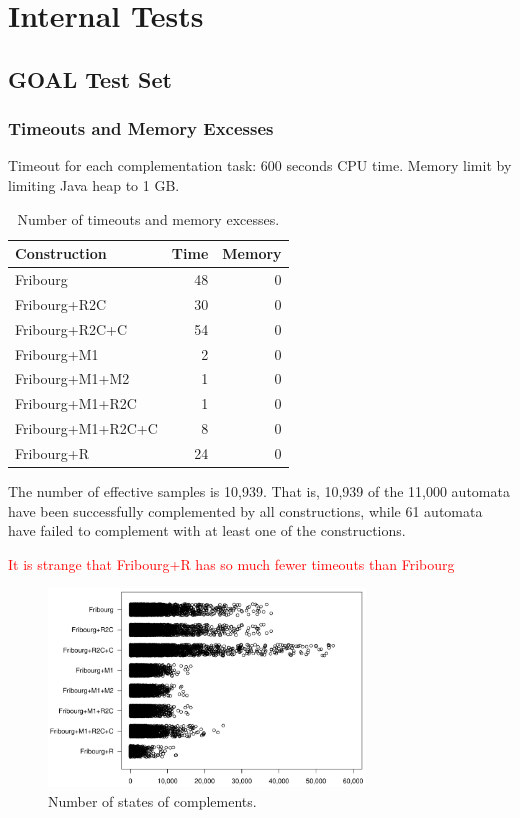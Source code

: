 \section{Internal Tests}

\subsection{GOAL Test Set}

\subsubsection{Timeouts and Memory Excesses}

Timeout for each complementation task: 600 seconds CPU time. Memory limit by limiting Java heap to 1 GB.

\begin{table}[ht]
\centering
\begin{tabular}{lrr}
  \hline
Construction & Time & Memory \\ 
  \hline
Fribourg & 48 & 0 \\ 
  Fribourg+R2C & 30 & 0 \\ 
  Fribourg+R2C+C & 54 & 0 \\ 
  Fribourg+M1 & 2 & 0 \\ 
  Fribourg+M1+M2 & 1 & 0 \\ 
  Fribourg+M1+R2C & 1 & 0 \\ 
  Fribourg+M1+R2C+C & 8 & 0 \\ 
  Fribourg+R & 24 & 0 \\ 
   \hline
\end{tabular}
\caption{Number of timeouts and memory excesses.}
\end{table}


The number of effective samples is 10,939. That is, 10,939 of the 11,000 automata have been successfully complemented by all constructions, while 61 automata have failed to complement with at least one of the constructions.

\textcolor{red}{It is strange that Fribourg+R has so much fewer timeouts than Fribourg}

\begin{figure}[ht]
\centering
\includegraphics[width=0.75\textwidth]{figures/r/internal/goal/stripchart.pdf}
\caption{Number of states of complements.}
\end{figure}


